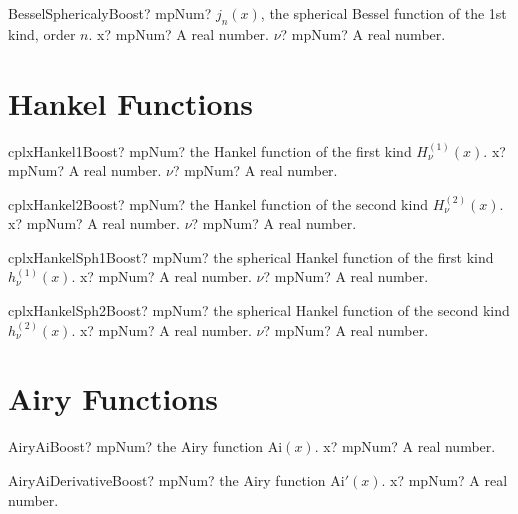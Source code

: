 \documentclass[12pt,a4paper,openany]{book}
\begin{document}
\begin{mpFunctionsExtract}
\mpFunctionTwo
{BesselSphericalyBoost? mpNum? $j_n(x)$, the spherical Bessel function of the 1st kind, order $n$.}
{x? mpNum? A real number.}
{$\nu$? mpNum? A real number.}
\end{mpFunctionsExtract}

\section{Hankel Functions}

\begin{mpFunctionsExtract}
\mpFunctionTwo
{cplxHankel1Boost? mpNum? the Hankel function of the first kind $H_{\nu}^{(1)}(x)$.}
{x? mpNum? A real number.}
{$\nu$? mpNum? A real number.}
\end{mpFunctionsExtract}

\begin{mpFunctionsExtract}
\mpFunctionTwo
{cplxHankel2Boost? mpNum? the Hankel function of the second kind $H_{\nu}^{(2)}(x)$.}
{x? mpNum? A real number.}
{$\nu$? mpNum? A real number.}
\end{mpFunctionsExtract}

\begin{mpFunctionsExtract}
\mpFunctionTwo
{cplxHankelSph1Boost? mpNum? the spherical Hankel function of the first kind $h_{\nu}^{(1)}(x)$.}
{x? mpNum? A real number.}
{$\nu$? mpNum? A real number.}
\end{mpFunctionsExtract}

\begin{mpFunctionsExtract}
\mpFunctionTwo
{cplxHankelSph2Boost? mpNum? the spherical Hankel function of the second kind $h_{\nu}^{(2)}(x)$.}
{x? mpNum? A real number.}
{$\nu$? mpNum? A real number.}
\end{mpFunctionsExtract}

\section{Airy Functions}

\begin{mpFunctionsExtract}
\mpFunctionOne
{AiryAiBoost? mpNum? the Airy function $\text{Ai}(x)$.}
{x? mpNum? A real number.}
\end{mpFunctionsExtract}

\begin{mpFunctionsExtract}
\mpFunctionOne
{AiryAiDerivativeBoost? mpNum? the Airy function $\text{Ai}'(x)$.}
{x? mpNum? A real number.}
\end{mpFunctionsExtract}
\end{document}
